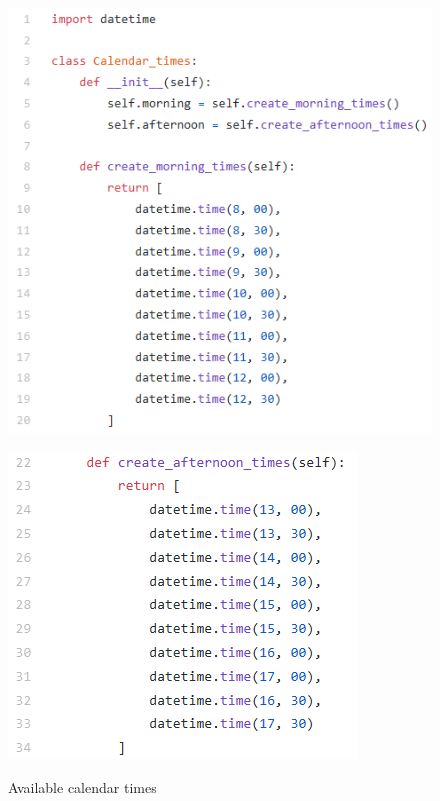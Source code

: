 \begin{figure}[t]
\begin{minipage}[t]{0.475\textwidth}
\centering
\includegraphics[scale=.65]{images/melanie_images/Calendar_times-1.png}
    \caption{Available calendar times}
    \label{Calendar_times}
\end{minipage}
\hfill
\begin{minipage}[t]{0.475\textwidth}
\centering
\includegraphics[scale=.65]{images/melanie_images/Calendar_times-2.png}
    \label{2}
\end{minipage}
\end{figure}

